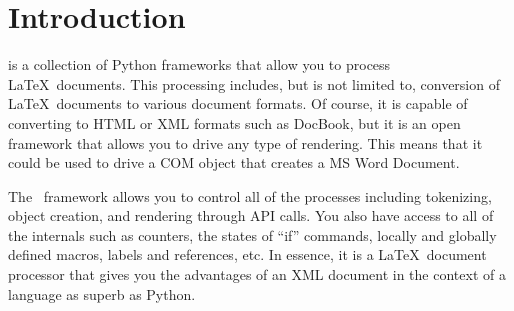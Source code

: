 
\chapter{Introduction}

\plasTeX is a collection of Python frameworks that allow you to process
\LaTeX\ documents.  This processing includes, but is not limited to,
conversion of \LaTeX\ documents to various document formats.  Of course, it is
capable of converting to HTML or XML formats such as DocBook,
but it is an open framework that allows you to drive any type of
rendering.  This means that it could be used to drive a COM object
that creates a MS Word Document.

The \plasTeX\ framework allows you to control all of the
processes including tokenizing, object creation, and rendering through
API calls.  You also have access to all of the internals such as
counters, the states of ``if'' commands, locally and globally
defined macros, labels and references, etc.  In essence, it is a \LaTeX\
document processor that gives you the advantages of an XML
document in the context of a language as superb as Python.

